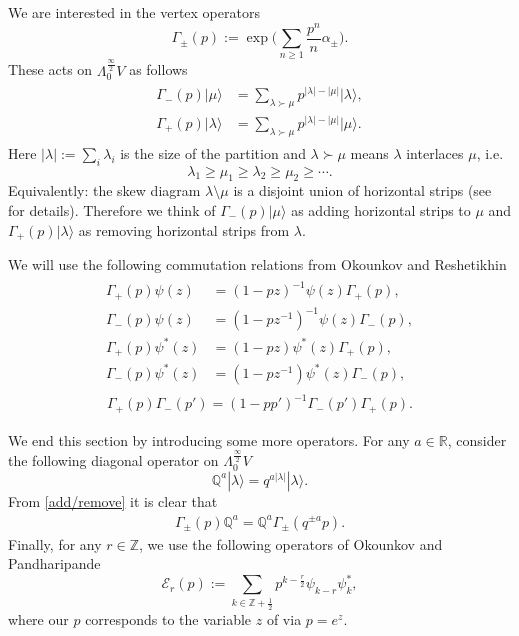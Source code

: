 \documentclass{amsart}
\theoremstyle{definition}
\newcommand{\RR} {\mathbb{R}}		%
\newcommand{\ZZ} {\mathbb{Z}}		%
\newcommand{\QQ} {\mathbb{Q}}		%
\newcommand{\E}{\mathcal{E}}
\begin{document}
We are interested in the vertex operators
$$
\Gamma_{\pm}(p) := \exp \Big( \sum_{n \geq 1} \frac{p^n}{n} \alpha_\pm \Big).
$$
These acts on $\Lambda^{\frac{\infty}{2}}_{0} V$ as follows
\begin{align} \label{add/remove}
\begin{split} 
\Gamma_-(p) |\mu \rangle &= \sum_{\lambda \succ \mu} p^{|\lambda| - |\mu|} |\lambda \rangle, \\ 
\Gamma_+(p) | \lambda \rangle &= \sum_{\lambda \succ \mu} p^{|\lambda| - |\mu|} |\mu \rangle.
\end{split}
\end{align}
Here $|\lambda|:=\sum_i \lambda_i$ is the size of the partition and $\lambda \succ \mu$ means $\lambda$ interlaces $\mu$, i.e.
$$
\lambda_1 \geq \mu_1 \geq \lambda_2 \geq \mu_2 \geq \cdots.
$$
Equivalently: the skew diagram $\lambda \setminus \mu$ is a disjoint union of horizontal strips (see \cite{You} for details). Therefore we think of $\Gamma_-(p) |\mu\rangle$ as adding horizontal strips to $\mu$ and $\Gamma_+(p) |\lambda\rangle$ as removing horizontal strips from $\lambda$. 

We will use the following commutation relations from Okounkov and Reshetikhin \cite{OR}
\begin{align} \label{gammapsi}
\begin{split}
\Gamma_+(p) \psi(z) &= (1-p z)^{-1} \psi(z) \Gamma_+(p), \\
\Gamma_-(p) \psi(z) &= (1-p z^{-1})^{-1} \psi(z) \Gamma_-(p), \\
\Gamma_+(p) \psi^*(z) &= (1-p z) \psi^*(z) \Gamma_+(p), \\
\Gamma_-(p) \psi^*(z) &= (1-p z^{-1}) \psi^*(z) \Gamma_-(p),
\end{split}
\end{align}
\begin{align} \label{gammapm}
\Gamma_+(p)\Gamma_-(p') = (1-p p')^{-1} \Gamma_-(p')\Gamma_+(p).
\end{align}

We end this section by introducing some more operators. For any $a \in \RR$, consider the following diagonal operator on $\Lambda^{\frac{\infty}{2}}_{0} V$ 
$$
\QQ^a |\lambda\rangle = q^{a|\lambda|} |\lambda\rangle.
$$
From \eqref{add/remove} it is clear that
\begin{align} \label{gammaQ}
\Gamma_{\pm}(p) \QQ^a = \QQ^a \Gamma_{\pm}(q^{\pm a} p).
\end{align}
Finally, for any $r \in \ZZ$, we use the following operators of Okounkov and Pandharipande \cite{OP}
$$
\E_r(p) := \sum_{k \in \ZZ + \frac{1}{2}} p^{k-\frac{r}{2}} \psi_{k-r} \psi_{k}^{*},
$$  
where our $p$ corresponds to the variable $z$ of \cite{OP} via $p=e^z$.
\end{document}
